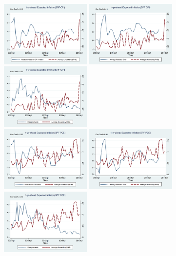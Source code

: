\documentclass[]{article}
\begin{document}
\begin{figure}[ht]
	\centering
	\smallskip
	\includegraphics[width=4.5cm]{figures/Inf1yf_CPIAU_varSPFCPIQ.png}
	\includegraphics[width=4.5cm]{figures/SPFCPI_FE_varSPFCPIQ.png}
	\includegraphics[width=4.5cm]{figures/CPI_disg_varSPFCPIQ.png}\\
	\smallskip
	\includegraphics[width=4.5cm]{figures/Inf1yf_PCE_varSPFPCEQ.png}
	\includegraphics[width=4.5cm]{figures/SPFPCE_FE_varSPFPCEQ.png}
	\includegraphics[width=4.5cm]{figures/PCE_disg_varSPFPCEQ.png}\\

\end{figure}
\end{document}
